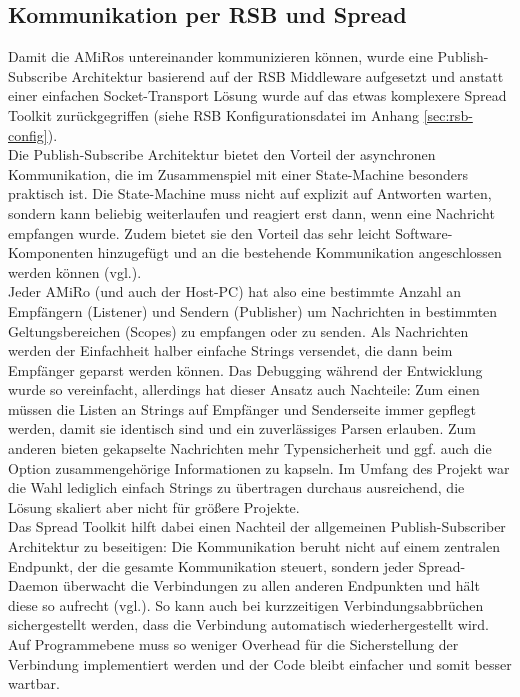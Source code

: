 \vfill

\subsection{Kommunikation per RSB und Spread} %
Damit die AMiRos untereinander kommunizieren können, wurde eine Publish-Subscribe Architektur basierend auf der RSB Middleware aufgesetzt und anstatt einer einfachen Socket-Transport Lösung wurde auf das etwas komplexere Spread Toolkit zurückgegriffen (siehe RSB Konfigurationsdatei im Anhang \ref{sec:rsb-config}).\\
Die Publish-Subscribe Architektur bietet den Vorteil der asynchronen Kommunikation, die im Zusammenspiel mit einer State-Machine besonders praktisch ist. Die State-Machine muss nicht auf explizit auf Antworten warten, sondern kann beliebig weiterlaufen und reagiert erst dann, wenn eine Nachricht empfangen wurde. Zudem bietet sie den Vorteil das sehr leicht Software-Komponenten hinzugefügt und an die bestehende Kommunikation angeschlossen werden können (vgl.\cite{Siciliano:2007}).\\
Jeder AMiRo (und auch der Host-PC) hat also eine bestimmte Anzahl an Empfängern (Listener) und Sendern (Publisher) um Nachrichten in bestimmten Geltungsbereichen (Scopes) zu empfangen oder zu senden. Als Nachrichten werden der Einfachheit halber einfache Strings versendet, die dann beim Empfänger geparst werden können. Das Debugging während der Entwicklung wurde so vereinfacht, allerdings hat dieser Ansatz auch Nachteile: Zum einen müssen die Listen an Strings auf Empfänger und Senderseite immer gepflegt werden, damit sie identisch sind und ein zuverlässiges Parsen erlauben. Zum anderen bieten gekapselte Nachrichten mehr Typensicherheit und ggf. auch die Option zusammengehörige Informationen zu kapseln. Im Umfang des Projekt war die Wahl lediglich einfach Strings zu übertragen durchaus ausreichend, die Lösung skaliert aber nicht für größere Projekte.\\
Das Spread Toolkit hilft dabei einen Nachteil der allgemeinen Publish-Subscriber Architektur zu beseitigen: Die Kommunikation beruht nicht auf einem zentralen Endpunkt, der die gesamte Kommunikation steuert, sondern jeder Spread-Daemon überwacht die Verbindungen zu allen anderen Endpunkten und hält diese so aufrecht (vgl.\cite{Siciliano:2007}). So kann auch bei kurzzeitigen Verbindungsabbrüchen sichergestellt werden, dass die Verbindung automatisch wiederhergestellt wird. Auf Programmebene  muss so weniger Overhead für die Sicherstellung der Verbindung implementiert werden und der Code bleibt einfacher und somit besser wartbar.\\
